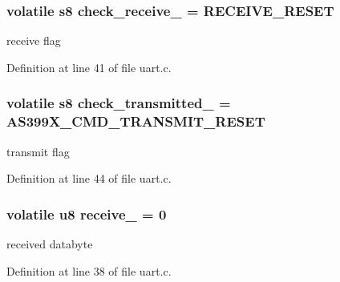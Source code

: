 \subsubsection[{check\-\_\-receive\-\_\-}]{ volatile s8 check\-\_\-receive\-\_\- = {\bf R\-E\-C\-E\-I\-V\-E\-\_\-\-R\-E\-S\-E\-T}}\label{uart_8c_a3c7058189ae15d7f8b8d73ed09180363}
receive flag 

Definition at line 41 of file uart.\-c.

\subsubsection[{check\-\_\-transmitted\-\_\-}]{ volatile s8 check\-\_\-transmitted\-\_\- = {\bf A\-S399\-X\-\_\-\-C\-M\-D\-\_\-\-T\-R\-A\-N\-S\-M\-I\-T\-\_\-\-R\-E\-S\-E\-T}}\label{uart_8c_a11b2698eee8a06f17b373678640bd795}
transmit flag 

Definition at line 44 of file uart.\-c.

\subsubsection[{receive\-\_\-}]{ volatile {\bf u8} receive\-\_\- = 0}\label{uart_8c_af54a9ad4318cd80f69c0e39667b3e070}
received databyte 

Definition at line 38 of file uart.\-c.

